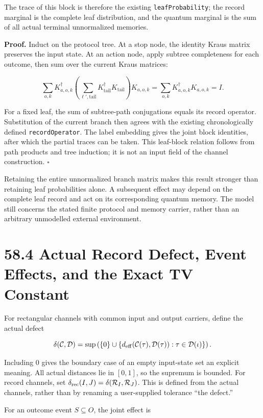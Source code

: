\documentclass[
  11pt,
  oneside]{book}
\begin{document}
The trace of this block is therefore the existing
\texttt{leaf\allowbreak Probability}; the record marginal is the complete leaf
distribution, and the quantum marginal is the sum of all actual terminal
unnormalized memories.

\textbf{Proof.} Induct on the protocol tree. At a stop node, the
identity Kraus matrix preserves the input state. At an action node,
apply subtree completeness for each outcome, then sum over the current
Kraus matrices:

\[
\sum_{o,k}K_{a,o,k}^\dagger
\left(\sum_{\ell',\text{tail}}K_{\text{tail}}^\dagger K_{\text{tail}}\right)
K_{a,o,k}
=\sum_{o,k}K_{a,o,k}^\dagger K_{a,o,k}=I.
\]

For a fixed leaf, the sum of subtree-path conjugations equals its record
operator. Substitution of the current branch then agrees with the
existing chronologically defined \texttt{record\allowbreak Operator}. The label
embedding gives the joint block identities, after which the partial
traces can be taken. This leaf-block relation follows from path products
and tree induction; it is not an input field of the channel
construction. \(\square\)

Retaining the entire unnormalized branch matrix makes this result
stronger than retaining leaf probabilities alone. A subsequent effect
may depend on the complete leaf record and act on its corresponding
quantum memory. The model still concerns the stated finite protocol and
memory carrier, rather than an arbitrary unmodelled external
environment.

\section{58.4 Actual Record Defect, Event Effects, and the Exact TV
Constant}

For rectangular channels with common input and output carriers, define
the actual defect

\[
\delta(\mathcal C,\mathcal D)=
\sup\left(\{0\}\cup\{d_{\rm eff}(\mathcal C(\tau),\mathcal D(\tau)):
\tau\in\mathcal D(\iota)\}\right).
\]

Including \(0\) gives the boundary case of an empty input-state set an
explicit meaning. All actual distances lie in \([0,1]\), so the supremum
is bounded. For record channels, set
\(\delta_{\rm rec}(I,J)=\delta(\mathcal R_I,\mathcal R_J)\). This is
defined from the actual channels, rather than by renaming a
user-supplied tolerance ``the defect.''

For an outcome event \(S\subseteq O\), the joint effect is
\end{document}
